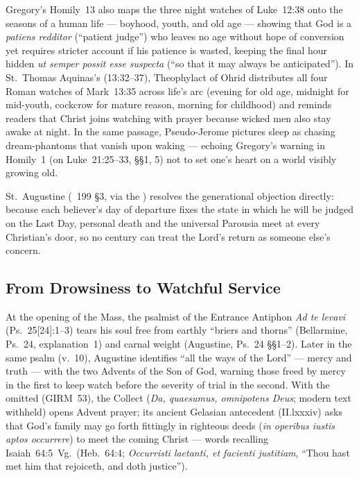 Gregory's Homily~13 also maps the three night watches of Luke~12:38 onto the seasons of a human life --- boyhood, youth, and old age --- showing that God is a \emph{patiens redditor} (``patient judge'') who leaves no age without hope of conversion yet requires stricter account if his patience is wasted, keeping the final hour hidden \emph{ut semper possit esse suspecta} (``so that it may always be anticipated''). In St.~Thomas Aquinas's  (13:32--37), Theophylact of Ohrid distributes all four Roman watches of Mark~13:35 across life's arc (evening for old age, midnight for mid-youth, cockcrow for mature reason, morning for childhood) and reminds readers that Christ joins watching with prayer because wicked men also stay awake at night. In the same  passage, Pseudo-Jerome pictures sleep as chasing dream-phantoms that vanish upon waking --- echoing Gregory's warning in Homily~1 (on Luke~21:25--33, §§1, 5) not to set one's heart on a world visibly growing old.

St.~Augustine (~199 §3, via the ) resolves the generational objection directly: because each believer's day of departure fixes the state in which he will be judged on the Last Day, personal death and the universal Parousia meet at every Christian's door, so no century can treat the Lord's return as someone else's concern.

\subsection{From Drowsiness to Watchful Service}

At the opening of the Mass, the psalmist of the Entrance Antiphon \emph{Ad te levavi} (Ps.~25[24]:1--3) tears his soul free from earthly ``briers and thorns'' (Bellarmine, Ps.~24, explanation~1) and carnal weight (Augustine, Ps.~24 §§1--2). Later in the same psalm (v.~10), Augustine identifies ``all the ways of the Lord'' --- mercy and truth --- with the two Advents of the Son of God, warning those freed by mercy in the first to keep watch before the severity of trial in the second. With the  omitted (GIRM~53), the Collect (\emph{Da, quaesumus, omnipotens Deus}; modern text withheld) opens Advent prayer; its ancient Gelasian antecedent (II.lxxxiv) asks that God's family may go forth fittingly in righteous deeds (\emph{in operibus iustis aptos occurrere}) to meet the coming Christ --- words recalling Isaiah~64:5~Vg.\ (Heb.~64:4; \emph{Occurristi laetanti, et facienti justitiam}, ``Thou hast met him that rejoiceth, and doth justice'').

